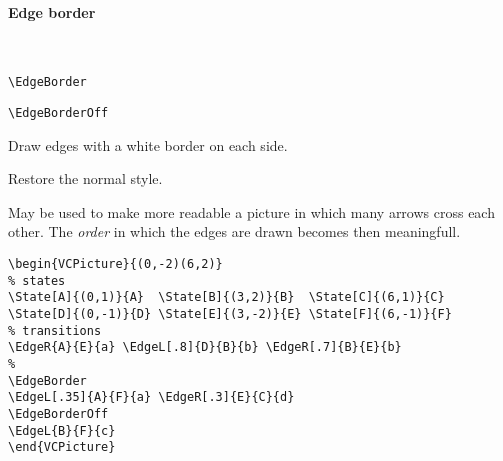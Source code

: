 \documentclass[11pt,twoside]{article}
\newlength{\ColoText}%
\newlength{\ColoFigu}%
\newlength{\parindenttemp} %
\newcommand{\noi}{\noindent}
\newcommand{\ee}{\text{\qquad}}               %
\newlength{\jsIndent}%
\newlength{\ColSource}%
\newlength{\ColFigur}%
\begin{document}
\paragraph{Edge border}
~

\noi 
\hspace*{-\jsIndent}
\begin{minipage}[t]{\ColoText}
        \par\vspace*{0mm}%
        \footnotesize
\verb+\EdgeBorder+ \ee 
   
\medskip 
\verb+\EdgeBorderOff+ \ee 
   
\end{minipage}%
\hspace*{1.2em}%
\begin{minipage}[t]{\ColoFigu}%
\par\vspace*{0mm}%
Draw edges with a white border on each side.

\smallskip 

Restore the normal style.
\end{minipage}%

\medskip
\noi
May be used to make more readable a picture in which many arrows 
cross each other.
The \emph{order} in which the edges are drawn becomes then meaningfull.

\noi 
\hspace*{-\jsIndent}
\begin{minipage}[c]{\ColFigur}%
\par\vspace*{0mm}%
\begin{center}
%
\end{center}
\end{minipage}%
\hspace*{1.2em}%
\begin{minipage}[c]{\ColSource}
\setlength{\parindent}{\parindenttemp}%
\par\vspace*{0mm}%
\footnotesize
\begin{verbatim}
\begin{VCPicture}{(0,-2)(6,2)}
% states
\State[A]{(0,1)}{A}  \State[B]{(3,2)}{B}  \State[C]{(6,1)}{C}
\State[D]{(0,-1)}{D} \State[E]{(3,-2)}{E} \State[F]{(6,-1)}{F}
% transitions 
\EdgeR{A}{E}{a} \EdgeL[.8]{D}{B}{b} \EdgeR[.7]{B}{E}{b} 
%
\EdgeBorder
\EdgeL[.35]{A}{F}{a} \EdgeR[.3]{E}{C}{d}
\EdgeBorderOff
\EdgeL{B}{F}{c}
\end{VCPicture}
\end{verbatim}
\normalsize
\end{minipage}%
\end{document}

